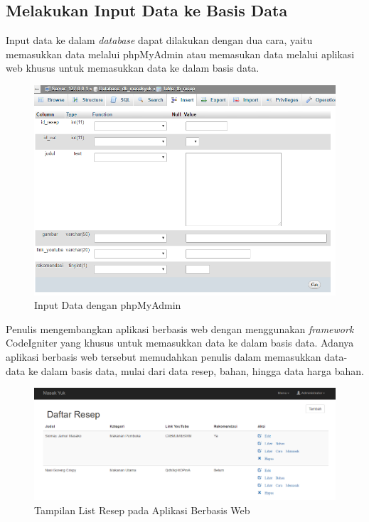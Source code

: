 	\subsection{Melakukan Input Data ke Basis Data}
		Input data ke dalam \textit{database} dapat dilakukan dengan dua cara, yaitu memasukkan data melalui phpMyAdmin atau memasukan data melalui aplikasi web khusus untuk memasukkan data ke dalam basis data.
		\begin{figure}[H]
			\centering
			\includegraphics[width=1\textwidth]{gambar/insert-phpmyadmin}
			\caption{Input Data dengan phpMyAdmin}
			\label{insert_phpmyadmin}
		\end{figure} 
		Penulis mengembangkan aplikasi berbasis web dengan menggunakan \textit{framework} CodeIgniter yang khusus untuk memasukkan data ke dalam basis data. Adanya aplikasi berbasis web tersebut memudahkan penulis dalam memasukkan data-data ke dalam basis data, mulai dari data resep, bahan, hingga data harga bahan.
		\begin{figure}[H]
			\centering
			\includegraphics[width=1\textwidth]{gambar/web-list-resep}
			\caption{Tampilan List Resep pada Aplikasi Berbasis Web}
			\label{web-list-resep}
		\end{figure} 
